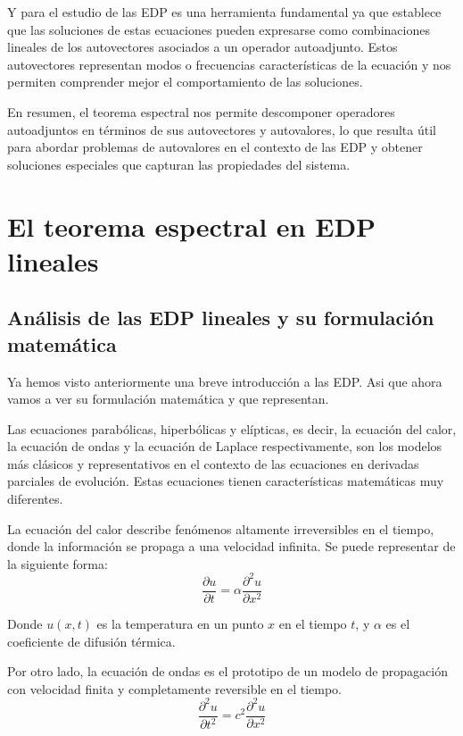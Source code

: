 \documentclass{article}
\begin{document}
    Y para el estudio de las EDP es una herramienta fundamental ya que establece que las soluciones de estas ecuaciones pueden expresarse como combinaciones lineales de los autovectores asociados a un operador autoadjunto. Estos autovectores representan modos o frecuencias características de la ecuación y nos permiten comprender mejor el comportamiento de las soluciones.
    
    En resumen, el teorema espectral nos permite descomponer operadores autoadjuntos en términos de sus autovectores y autovalores, lo que resulta útil para abordar problemas de autovalores en el contexto de las EDP y obtener soluciones especiales que capturan las propiedades del sistema.


\newpage

\section{El teorema espectral en EDP lineales}
    \subsection{Análisis de las EDP lineales y su formulación matemática}
    Ya hemos visto anteriormente una breve introducción a las EDP. Asi que ahora vamos a ver su formulación matemática y que representan. 

    Las ecuaciones parabólicas, hiperbólicas y elípticas, es decir, la ecuación del calor, la ecuación de ondas y la ecuación de Laplace respectivamente, son los modelos más clásicos y representativos en el contexto de las ecuaciones en derivadas parciales de evolución. Estas ecuaciones tienen características matemáticas muy diferentes. 

    La ecuación del calor describe fenómenos altamente irreversibles en el tiempo, donde la información se propaga a una velocidad infinita. Se puede representar de la siguiente forma:
    \begin{equation}
        \frac{\partial u}{\partial t} = \alpha \frac{\partial^2 u}{\partial x^2}
        \end{equation}
    
        Donde $u(x,t)$ es la temperatura en un punto $x$ en el tiempo $t$, y $\alpha$ es el coeficiente de difusión térmica.

    Por otro lado, la ecuación de ondas es el prototipo de un modelo de propagación con velocidad finita y completamente reversible en el tiempo.
    \begin{equation}
        \frac{\partial^2 u}{\partial t^2} = c^2 \frac{\partial^2 u}{\partial x^2}
        \end{equation}
        
\end{document}
